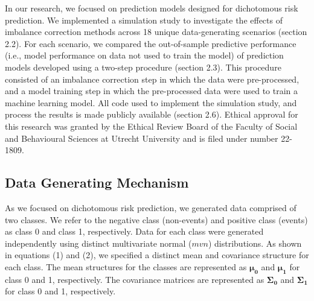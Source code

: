 \documentclass[AMA,STIX1COL,]{WileyNJD-v2}
\begin{document}
In our research, we focused on prediction models designed for
dichotomous risk prediction. We implemented a simulation study to
investigate the effects of imbalance correction methods across 18 unique
data-generating scenarios (section 2.2). For each scenario, we compared
the out-of-sample predictive performance (i.e., model performance on
data not used to train the model) of prediction models developed using a
two-step procedure (section 2.3). This procedure consisted of an
imbalance correction step in which the data were pre-processed, and a
model training step in which the pre-processed data were used to train a
machine learning model. All code used to implement the simulation study,
and process the results is made publicly available (section 2.6).
Ethical approval for this research was granted by the Ethical Review
Board of the Faculty of Social and Behavioural Sciences at Utrecht
University and is filed under number 22-1809.

\hypertarget{data-generating-mechanism}{%
\subsection{Data Generating Mechanism}\label{data-generating-mechanism}}

\hfill\break
As we focused on dichotomous risk prediction, we generated data
comprised of two classes. We refer to the negative class (non-events)
and positive class (events) as class 0 and class 1, respectively. Data
for each class were generated independently using distinct multivariate
normal (\(mvn\)) distributions. As shown in equations (1) and (2), we
specified a distinct mean and covariance structure for each class. The
mean structures for the classes are represented as \(\pmb{\mu_0}\) and
\(\pmb{\mu_1}\) for class 0 and 1, respectively. The covariance matrices
are represented as \(\pmb{\Sigma_0}\) and \(\pmb{\Sigma_1}\) for class 0
and 1, respectively.
\end{document}
